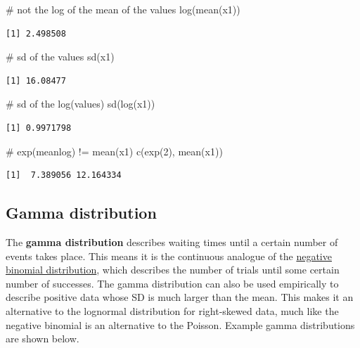 \documentclass[
  13,
  letterpaper,
]{report}
\newenvironment{Shaded}{\begin{snugshade}}{\end{snugshade}}
\newcommand{\CommentTok}[1]{\textcolor[rgb]{0.37,0.37,0.37}{#1}}
\newcommand{\DecValTok}[1]{\textcolor[rgb]{0.68,0.00,0.00}{#1}}
\newcommand{\FunctionTok}[1]{\textcolor[rgb]{0.28,0.35,0.67}{#1}}
\newcommand{\NormalTok}[1]{\textcolor[rgb]{0.00,0.23,0.31}{#1}}
\begin{document}
\begin{Shaded}
\begin{Highlighting}[]
\CommentTok{\# not the log of the mean of the values}
\FunctionTok{log}\NormalTok{(}\FunctionTok{mean}\NormalTok{(x1))}
\end{Highlighting}
\end{Shaded}

\begin{verbatim}
[1] 2.498508
\end{verbatim}

\begin{Shaded}
\begin{Highlighting}[]
\CommentTok{\# sd of the values}
\FunctionTok{sd}\NormalTok{(x1)}
\end{Highlighting}
\end{Shaded}

\begin{verbatim}
[1] 16.08477
\end{verbatim}

\begin{Shaded}
\begin{Highlighting}[]
\CommentTok{\# sd of the log(values)}
\FunctionTok{sd}\NormalTok{(}\FunctionTok{log}\NormalTok{(x1))}
\end{Highlighting}
\end{Shaded}

\begin{verbatim}
[1] 0.9971798
\end{verbatim}

\begin{Shaded}
\begin{Highlighting}[]
\CommentTok{\# exp(meanlog) != mean(x1)}
\FunctionTok{c}\NormalTok{(}\FunctionTok{exp}\NormalTok{(}\DecValTok{2}\NormalTok{), }
  \FunctionTok{mean}\NormalTok{(x1))}
\end{Highlighting}
\end{Shaded}

\begin{verbatim}
[1]  7.389056 12.164334
\end{verbatim}

\subsection{Gamma distribution}\label{sec-dist-gamma}

The \textbf{gamma distribution} describes waiting times until a certain
number of events takes place. This means it is the continuous analogue
of the \href{@sec-dist-negbin}{negative binomial distribution}, which
describes the number of trials until some certain number of successes.
The gamma distribution can also be used empirically to describe positive
data whose SD is much larger than the mean. This makes it an alternative
to the lognormal distribution for right-skewed data, much like the
negative binomial is an alternative to the Poisson. Example gamma
distributions are shown below.
\end{document}
